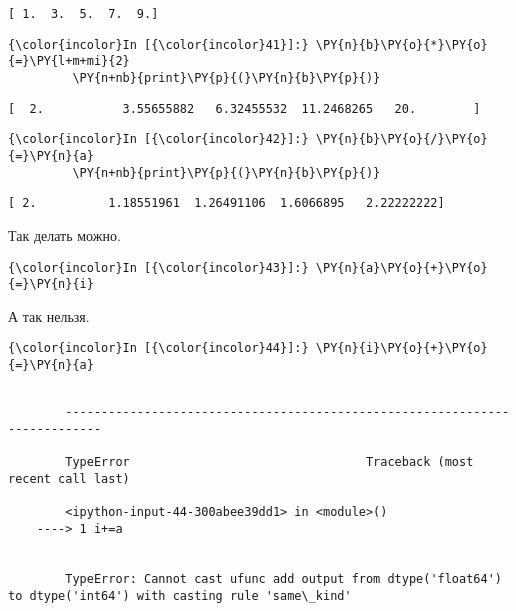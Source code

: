     \begin{Verbatim}[commandchars=\\\{\}]
[ 1.  3.  5.  7.  9.]

    \end{Verbatim}

    \begin{Verbatim}[commandchars=\\\{\}]
{\color{incolor}In [{\color{incolor}41}]:} \PY{n}{b}\PY{o}{*}\PY{o}{=}\PY{l+m+mi}{2}
         \PY{n+nb}{print}\PY{p}{(}\PY{n}{b}\PY{p}{)}
\end{Verbatim}

    \begin{Verbatim}[commandchars=\\\{\}]
[  2.           3.55655882   6.32455532  11.2468265   20.        ]

    \end{Verbatim}

    \begin{Verbatim}[commandchars=\\\{\}]
{\color{incolor}In [{\color{incolor}42}]:} \PY{n}{b}\PY{o}{/}\PY{o}{=}\PY{n}{a}
         \PY{n+nb}{print}\PY{p}{(}\PY{n}{b}\PY{p}{)}
\end{Verbatim}

    \begin{Verbatim}[commandchars=\\\{\}]
[ 2.          1.18551961  1.26491106  1.6066895   2.22222222]

    \end{Verbatim}

    Так делать можно.

    \begin{Verbatim}[commandchars=\\\{\}]
{\color{incolor}In [{\color{incolor}43}]:} \PY{n}{a}\PY{o}{+}\PY{o}{=}\PY{n}{i}
\end{Verbatim}

    А так нельзя.

    \begin{Verbatim}[commandchars=\\\{\}]
{\color{incolor}In [{\color{incolor}44}]:} \PY{n}{i}\PY{o}{+}\PY{o}{=}\PY{n}{a}
\end{Verbatim}

    \begin{Verbatim}[commandchars=\\\{\}]

        ---------------------------------------------------------------------------

        TypeError                                 Traceback (most recent call last)

        <ipython-input-44-300abee39dd1> in <module>()
    ----> 1 i+=a
    

        TypeError: Cannot cast ufunc add output from dtype('float64') to dtype('int64') with casting rule 'same\_kind'

    \end{Verbatim}

